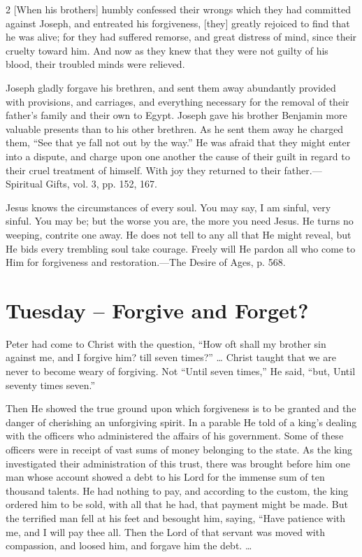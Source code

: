\documentclass[a4paper, 10pt, twoside, headings=small]{scrartcl}
\begin{document}
\begin{multicols}{2}
[When his brothers] humbly confessed their wrongs which they had committed against Joseph, and entreated his forgiveness, [they] greatly rejoiced to find that he was alive; for they had suffered remorse, and great distress of mind, since their cruelty toward him. And now as they knew that they were not guilty of his blood, their troubled minds were relieved.

Joseph gladly forgave his brethren, and sent them away abundantly provided with provisions, and carriages, and everything necessary for the removal of their father’s family and their own to Egypt. Joseph gave his brother Benjamin more valuable presents than to his other brethren. As he sent them away he charged them, “See that ye fall not out by the way.” He was afraid that they might enter into a dispute, and charge upon one another the cause of their guilt in regard to their cruel treatment of himself. With joy they returned to their father.—Spiritual Gifts, vol. 3, pp. 152, 167.

Jesus knows the circumstances of every soul. You may say, I am sinful, very sinful. You may be; but the worse you are, the more you need Jesus. He turns no weeping, contrite one away. He does not tell to any all that He might reveal, but He bids every trembling soul take courage. Freely will He pardon all who come to Him for forgiveness and restoration.—The Desire of Ages, p. 568.

\section*{Tuesday – Forgive and Forget?}

Peter had come to Christ with the question, “How oft shall my brother sin against me, and I forgive him? till seven times?” … Christ taught that we are never to become weary of forgiving. Not “Until seven times,” He said, “but, Until seventy times seven.”

Then He showed the true ground upon which forgiveness is to be granted and the danger of cherishing an unforgiving spirit. In a parable He told of a king’s dealing with the officers who administered the affairs of his government. Some of these officers were in receipt of vast sums of money belonging to the state. As the king investigated their administration of this trust, there was brought before him one man whose account showed a debt to his Lord for the immense sum of ten thousand talents. He had nothing to pay, and according to the custom, the king ordered him to be sold, with all that he had, that payment might be made. But the terrified man fell at his feet and besought him, saying, “Have patience with me, and I will pay thee all. Then the Lord of that servant was moved with compassion, and loosed him, and forgave him the debt. …


\end{multicols}
\end{document}
